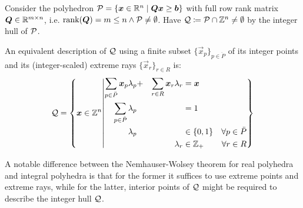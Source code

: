 \begin{theorem}\label{th:nemhauser-wolsey-integer}
Consider the polyhedron $\mathcal{P} = \{{\bm{x}} \in \mathbb{R}^n \mid {\bm{Q}} {\bm{x}} \geq {\bm{b}}\}$ with full row rank matrix ${\bm{Q}} \in \mathbb{R}^{m \times n}$, i.e. $\operatorname{rank}({\bm{Q}}) = m \leq n \land \mathcal{P} \neq \emptyset$. Have $\mathcal{Q} \coloneqq \mathcal{P} \cap \mathbb{Z}^n \neq \emptyset$ by the integer hull of $\mathcal{P}$.

An equivalent description of $\mathcal{Q}$ using a finite subset $\{\vec{x}_p\}_{p \in \ddot{P}}$ of its integer points and its (integer-scaled) extreme rays $\{\vec{x}_r\}_{r \in R}$ is:
\begin{equation}
\mathcal{Q} = \left\{ {\bm{x}} \in \mathbb{Z}^n \middle\vert
\begin{aligned}
\sum_{p \in \ddot{P}} {\bm{x}}_p \lambda_p &+ &\sum_{r \in R} {\bm{x}}_r \lambda_r &= {\bm{x}} &\\
\sum_{p \in \ddot{P}} \lambda_p & & &= 1 &\\
\lambda_p & & &\in \{0, 1\} &\forall p \in \ddot{P}\\
& &\lambda_r &\in \mathbb{Z}_+ &\forall r \in R
\end{aligned}
\right\}
\end{equation}
\end{theorem}

\begin{note}\label{note:nemhauser-wolsey}
A notable difference between the Nemhauser-Wolsey theorem for real polyhedra and integral polyhedra is that for the former it suffices to use extreme points and extreme rays, while for the latter, interior points of $\mathcal{Q}$ might be required to describe the integer hull $\mathcal{Q}$.
\end{note}
